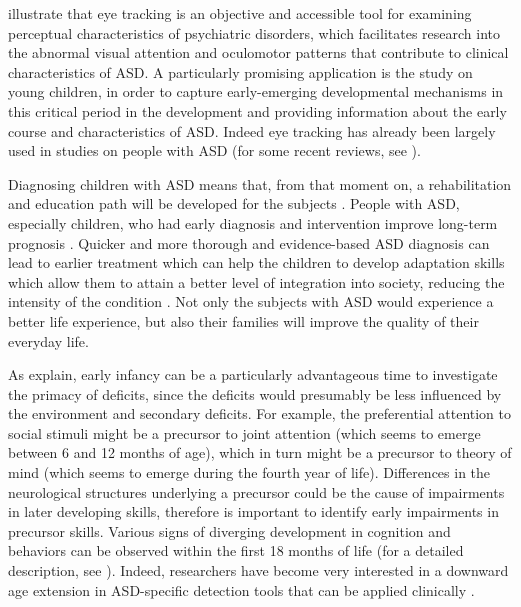 \cite{sasson2012children} illustrate that eye tracking is an objective and accessible tool for examining perceptual characteristics of psychiatric disorders, which facilitates research into the abnormal visual attention and oculomotor patterns that contribute to clinical characteristics of ASD. A particularly promising application is the study on young children, in order to capture early-emerging developmental mechanisms in this critical period in the development and providing information about the early course and characteristics of ASD. Indeed eye tracking has already been largely used in studies on people with ASD (for some recent reviews, see \citealp{boraston2007eyetrackingASD,brenner2007visualsearch,falck-ytter2013eyetrackingASD,papagiannopoulou2014review,chitategmark2016socialattention,johnson2016review,bolte2016detection,frazier2017socialgaze}).

Diagnosing children with ASD means that, from that moment on, a rehabilitation and education path will be developed for the subjects \citep{apa2017diagnosis}. People with ASD, especially children, who had early diagnosis and intervention improve long-term prognosis \citep{vargas2016diagnosis}. Quicker and more thorough and evidence-based ASD diagnosis can lead to earlier treatment which can help the children to develop adaptation skills which allow them to attain a better level of integration into society, reducing the intensity of the condition \citep{martineau2011pupil,towie2016screening}. Not only the subjects with ASD would experience a better life experience, but also their families will improve the quality of their everyday life.

As \cite{anderson2006visualscanning} explain, early infancy can be a particularly advantageous time to investigate the primacy of deficits, since the deficits would presumably be less influenced by the environment and secondary deficits. For example, the preferential attention to social stimuli might be a precursor to joint attention (which seems to emerge between 6 and 12 months of age), which in turn might be a precursor to theory of mind (which seems to emerge during the fourth year of life). Differences in the neurological structures underlying a precursor could be the cause of impairments in later developing skills, therefore is important to identify early impairments in precursor skills. Various signs of diverging development in cognition and behaviors can be observed within the first 18 months of life (for a detailed description, see \citealp{shultz2015earlydepartures}). Indeed, researchers have become very interested in a downward age extension in ASD-specific detection tools that can be applied clinically \citep{towie2016screening}.

